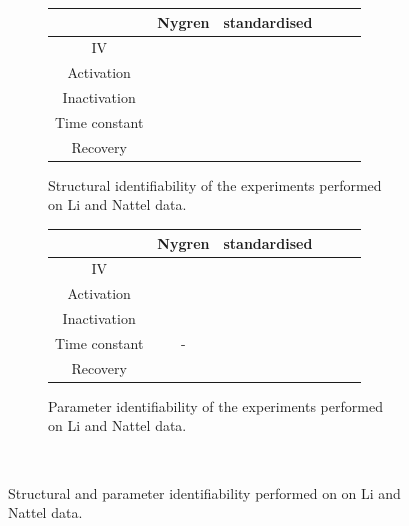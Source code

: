 \documentclass[11pt]{report}
\newcommand{\cmark}{ \color{green} \ding{51}}%
\newcommand{\xmark}{ \color{red} \ding{55}}%
\begin{document}
\begin{figure}[H]
    \centering
    \captionsetup{singlelinecheck = false, format= hang, justification=centerlast, font=footnotesize, labelsep=space}
    \begin{subfigure}[b]{0.49\textwidth}
    \centering
        \begin{tabular}{|c|c|c|c|c|c|}
        \hline
        & Nygren & standardised \\
        \hline
        IV & \cmark   &  \cmark    \\
        \hline
        Activation &  \cmark  &    \cmark   \\
        \hline
        Inactivation &  \cmark &  \cmark  \\
        \hline
        Time constant &  \xmark &  \cmark  \\
        \hline
        Recovery & \cmark &  \cmark   \\
        \hline
        \end{tabular}
        \caption{Structural identifiability of the experiments performed on Li and Nattel \cite{Li1997} data.}
    \end{subfigure}
    \begin{subfigure}[b]{0.49\textwidth}
    \centering
        \begin{tabular}{|c|c|c|c|c|c|}
        \hline
        & Nygren & standardised \\
        \hline
        IV & \cmark   &  \cmark    \\
        \hline
        Activation &  \cmark  &    \cmark   \\
        \hline
        Inactivation &  \cmark &  \xmark  \\
        \hline
        Time constant &  - &  \cmark    \\
        \hline
        Recovery & \cmark &  \cmark   \\
        \hline
        \end{tabular}
        \caption{Parameter identifiability of the experiments performed on Li and Nattel data. \cite{Li1997}}
    \end{subfigure}

    ~
    \caption{Structural and parameter identifiability performed on  on Li and Nattel data. \cite{Li1997}}
    \label{fig:CaLIndentifiabilityLi}
\end{figure}
\end{document}
